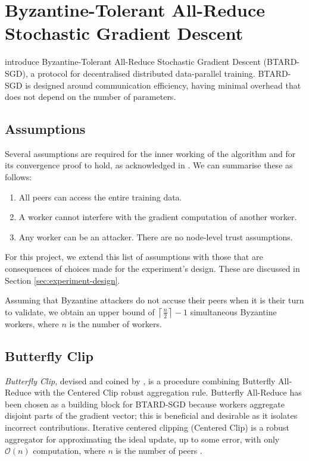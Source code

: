 \documentclass{article}
\begin{document}
\section{Byzantine-Tolerant All-Reduce Stochastic Gradient Descent}

\cite{gorbunov2021secure} introduce Byzantine-Tolerant All-Reduce Stochastic Gradient Descent (BTARD-SGD), a protocol for decentralised distributed data-parallel training. BTARD-SGD is designed around communication efficiency, having minimal overhead that does not depend on the number of parameters. 

\subsection{Assumptions}
Several assumptions are required for the inner working of the algorithm and for its convergence proof to hold, as acknowledged in \cite{gorbunov2021secure}. We can summarise these as follows:
\begin{enumerate}
\item All peers can access the entire training data.
\item A worker cannot interfere with the gradient computation of another worker. 
\item Any worker can be an attacker. There are no node-level trust assumptions.
\end{enumerate}

For this project, we extend this list of assumptions with those that are consequences of choices made for the experiment's design. These are discussed in Section \ref{sec:experiment-design}.

Assuming that Byzantine attackers do not accuse their peers when it is their turn to validate, we obtain an upper bound of $\left\lceil\frac{n}{2}\right\rceil-1$ simultaneous Byzantine workers, where $n$ is the number of workers.

\subsection{Butterfly Clip}
\textit{Butterfly Clip}, devised and coined by \cite{gorbunov2021secure}, is a procedure combining Butterfly All-Reduce with the Centered Clip robust aggregation rule. Butterfly All-Reduce has been chosen as a building block for BTARD-SGD because workers aggregate disjoint parts of the gradient vector; this is beneficial and desirable as it isolates incorrect contributions. Iterative centered clipping (Centered Clip) is a robust aggregator for approximating the ideal update, up to some error, with only $\mathcal{O}(n)$ computation, where $n$ is the number of peers \citep{karimireddy2021learning}. 
\end{document}
